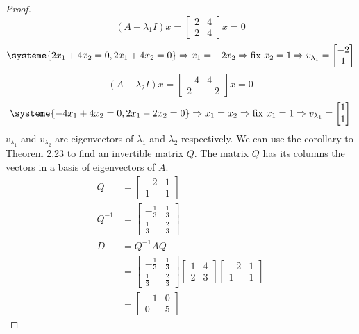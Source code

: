 \documentclass[11pt]{scrartcl}
\begin{document}
\begin{proof}
	\[
		(A - \lambda_1I)x =  \begin{bmatrix}2 & 4 \\ 2 & 4\end{bmatrix}x = 0
	\]
	\[
		\systeme{
			2x_1 + 4x_2 = 0,
			2x_1 + 4x_2 = 0
		}
		\Rightarrow x_1 = -2x_2
		\Rightarrow \text{fix } x_2 = 1
		\Rightarrow v_{\lambda_1} =  \begin{bmatrix}-2 \\1 \end{bmatrix}
	\]
	\[
		(A - \lambda_2I)x = \begin{bmatrix}-4 & 4 \\ 2 & -2  \end{bmatrix}x = 0
	\]
	\[
		\systeme{
			-4x_1 + 4x_2 = 0,
			2x_1 - 2x_2 = 0
		}
		\Rightarrow x_1 = x_2
		\Rightarrow \text{fix } x_1 = 1
		\Rightarrow v_{\lambda_1} =  \begin{bmatrix}1 \\1  \end{bmatrix}
	\]
	$v_{\lambda_1}$ and $v_{\lambda_2}$ are eigenvectors of $\lambda_1$ and $\lambda_2$ respectively.
	We can use the corollary to Theorem 2.23 to find an invertible matrix $Q$.
	The matrix $Q$ has its columns the vectors in a basis of eigenvectors of $A$.
	\begin{align*}
		Q      & = 
		\begin{bmatrix}
			-2  & 1 \\
			1 & 1
		\end{bmatrix} \\
		Q^{-1} & = \begin{bmatrix}-\frac{1}{3}&\frac{1}{3}\\ \frac{1}{3}&\frac{2}{3}\end{bmatrix} \\
		D      & = Q^{-1} A Q                 \\
		       & =
		\begin{bmatrix}-\frac{1}{3}&\frac{1}{3}\\ \frac{1}{3}&\frac{2}{3}\end{bmatrix}
		\begin{bmatrix}
			1 & 4 \\ 2 & 3
		\end{bmatrix}
		\begin{bmatrix}
			-2  & 1 \\
			1 & 1
		\end{bmatrix}            \\
		       & =
		\begin{bmatrix}
		-1&0\\ 0&5

\end{bmatrix}
\end{align*}
\end{proof}
\end{document}
